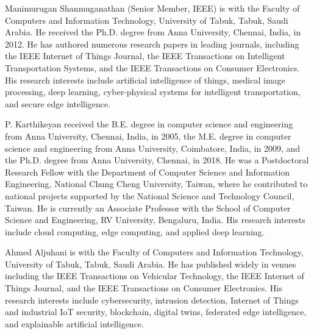 \documentclass[lettersize,journal]{IEEEtran}
\begin{document}
\vspace{-20pt}
\begin{IEEEbiographynophoto}{Manimurugan Shanmuganathan}
(Senior Member, IEEE) is with the Faculty of Computers and Information Technology, University of Tabuk, Tabuk, Saudi Arabia. He received the Ph.D. degree from Anna University, Chennai, India, in 2012. He has authored numerous research papers in leading journals, including the IEEE Internet of Things Journal, the IEEE Transactions on Intelligent Transportation Systems, and the IEEE Transactions on Consumer Electronics. His research interests include artificial intelligence of things, medical image processing, deep learning, cyber-physical systems for intelligent transportation, and secure edge intelligence.
\end{IEEEbiographynophoto}

\vspace{-20pt}
\begin{IEEEbiographynophoto}{P. Karthikeyan}
received the B.E. degree in computer science and engineering from Anna University, Chennai, India, in 2005, the M.E. degree in computer science and engineering from Anna University, Coimbatore, India, in 2009, and the Ph.D. degree from Anna University, Chennai, in 2018. He was a Postdoctoral Research Fellow with the Department of Computer Science and Information Engineering, National Chung Cheng University, Taiwan, where he contributed to national projects supported by the National Science and Technology Council, Taiwan. He is currently an Associate Professor with the School of Computer Science and Engineering, RV University, Bengaluru, India. His research interests include cloud computing, edge computing, and applied deep learning.
\end{IEEEbiographynophoto}

\vspace{-20pt}
\begin{IEEEbiographynophoto}{Ahmed Aljuhani}
is with the Faculty of Computers and Information Technology, University of Tabuk, Tabuk, Saudi Arabia. He has published widely in venues including the IEEE Transactions on Vehicular Technology, the IEEE Internet of Things Journal, and the IEEE Transactions on Consumer Electronics. His research interests include cybersecurity, intrusion detection, Internet of Things and industrial IoT security, blockchain, digital twins, federated edge intelligence, and explainable artificial intelligence.
\end{IEEEbiographynophoto}
\end{document}
